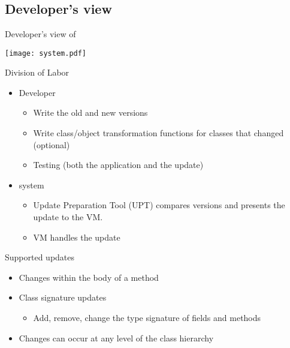 
\section{\DSU}
\ShowTOC[currentsection]
\subsection{Developer's view}

\begin{frame}{Developer's view of \DSU{}}%
\begin{center}
\texttt{[image: system.pdf]}
\end{center}
\end{frame}

\begin{frame}{Division of Labor}%
\begin{itemize}
\item Developer
  \begin{itemize}
  \item Write the old and new versions
  \item Write class/object transformation functions for classes that
        changed (optional)
  \item Testing (both the application and the update)
  \end{itemize}
\item \DSU{} system
  \begin{itemize}
  \item Update Preparation Tool (UPT) compares versions and presents the
        update to the \DSU{} VM.
  \item \DSU{} VM handles the update
  \end{itemize}
\end{itemize}
\end{frame}

\begin{frame}{Supported updates}%
\begin{itemize}
\item Changes within the body of a method
\item Class signature updates
  \begin{itemize}
  \item Add, remove, change the type signature of fields and methods
  \end{itemize}
\item Changes can occur at any level of the class hierarchy
\end{itemize}
\end{frame}

